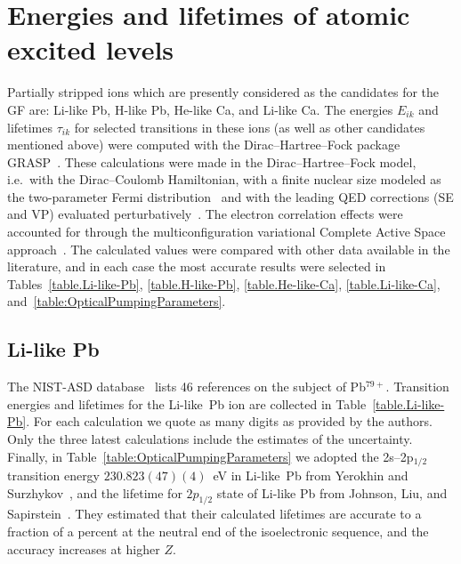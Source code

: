 \newcommand{\thicksim}{\,\mathbf{\sim}\,}
\section{Energies and lifetimes of atomic excited levels}
\label{section.IonChoice}

Partially stripped ions which are presently considered as the candidates for the GF are:  Li-like Pb, H-like Pb, He-like Ca, and Li-like Ca.  The energies $ E_{ik} $ and lifetimes $ \tau_{ik} $ for selected transitions in these ions (as well as other candidates mentioned above) were computed with the Dirac--Hartree--Fock package {\sf GRASP}~\cite{compas.github,grasp2K:2013,GRASP2018,GrantBook2007,Grant1994}.  These calculations were made in the Dirac--Hartree--Fock model, i.e.~with the Dirac--Coulomb Hamiltonian, with a finite nuclear size modeled as the two-parameter Fermi distribution~\cite{grasp89} and with the leading QED corrections (SE and VP) evaluated perturbatively~\cite{graspMcKenzie1980}.  The electron correlation effects were accounted for through the multiconfiguration variational Complete Active Space approach~\cite{BieronAu2009,Bieron:e-N:2015}.  The calculated values were compared with other data available in the literature, and in each case the most accurate results were selected in Tables~\ref{table.Li-like-Pb}, \ref{table.H-like-Pb}, \ref{table.He-like-Ca}, \ref{table.Li-like-Ca}, and~\ref{table:OpticalPumpingParameters}.

\subsection{Li-like Pb}
\label{section.Li-like-Pb}
The NIST-ASD database~\cite{NIST-ASD} lists 46 references on the subject of Pb$^{79+}$.  Transition energies and lifetimes for the Li-like~Pb ion are collected in Table~\ref{table.Li-like-Pb}.  For each calculation we quote as many digits as provided by the authors.  Only the three latest calculations include the estimates of the uncertainty.  Finally, in Table~\ref{table:OpticalPumpingParameters} we adopted the 2s--2p$_{1/2}$ transition energy
$ 230.823(47)(4) $~eV in Li-like~Pb from Yerokhin and Surzhykov~\cite{YerokhinSurzhykov:2018a,YerokhinSurzhykov:2018b}, and the lifetime for $ 2p_{1/2} $ state of Li-like Pb from Johnson, Liu, and Sapirstein~\cite{JohnsonLiuSapirstein:1996}.  They estimated that their calculated lifetimes are accurate to a fraction of a percent at the neutral end of the isoelectronic sequence, and the accuracy increases at higher $Z$.

